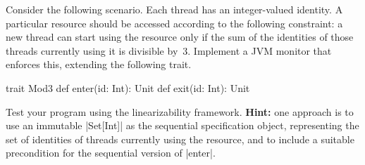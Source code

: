 \begin{question}
\label{ex:mod3M}
Consider the following scenario.  Each thread has an integer-valued identity.
A particular resource should be accessed according to the following
constraint: a new thread can start using the resource only if the sum of the
identities of those threads currently using it is divisible by~3.  Implement a
JVM monitor that enforces this, extending the following trait.
\begin{scala}
trait Mod3{
  def enter(id: Int): Unit
  def exit(id: Int): Unit
}
\end{scala}

Test your program using the linearizability framework.  \textbf{Hint:} one
approach is to use an immutable |Set[Int]| as the sequential specification
object, representing the set of identities of threads currently using the
resource, and to include a suitable precondition for the sequential version of
|enter|.
\end{question}


